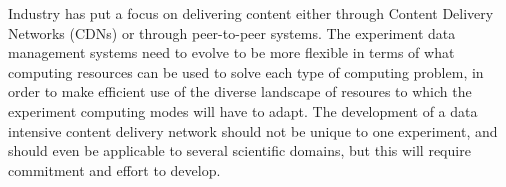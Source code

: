 Industry has put a focus on delivering content either through Content
Delivery Networks (CDNs) or through peer-to-peer systems.  The experiment data
management systems need to evolve to be more flexible in terms of what 
computing resources can be used to solve each type of computing problem,
in order to make efficient use of the diverse landscape of resoures to which
the experiment computing modes will have to adapt.
The development of a data intensive content delivery network should not be
unique to one experiment, and should even be applicable to several scientific
domains, but this will require commitment and effort to develop.


